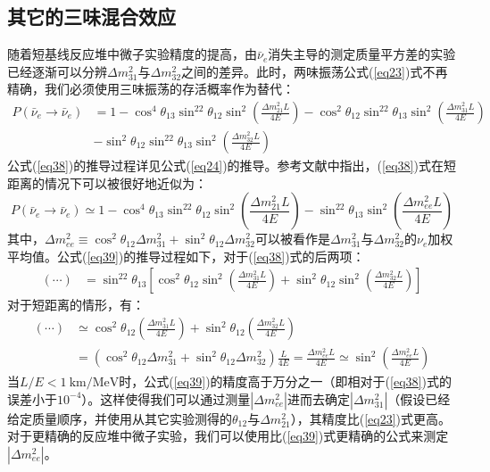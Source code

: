 \documentclass{article}
\begin{document}
	\subsection{其它的三味混合效应}
	随着短基线反应堆中微子实验精度的提高，由$\bar{\nu}_e$消失主导的测定质量平方差的实验已经逐渐可以分辨$\Delta m_{31}^2$与$\Delta m_{32}^2$之间的差异。此时，两味振荡公式(\ref{eq23})式不再精确，我们必须使用三味振荡的存活概率作为替代：
	\begin{equation}
		\begin{aligned}
		P(\bar{\nu}_e\to\bar{\nu}_e)&=1-\cos^4\theta_{13}\sin^22\theta_{12}\sin^2\left(\frac{\Delta m_{21}^2L}{4E}\right)-\cos^2\theta_{12}\sin^22\theta_{13}\sin^2\left(\frac{\Delta m_{31}^2L}{4E}\right)\\&-\sin^2\theta_{12}\sin^22\theta_{13}\sin^2\left(\frac{\Delta m_{32}^2L}{4E}\right)
		\end{aligned}
		\label{eq38}
	\end{equation}
	公式(\ref{eq38})的推导过程详见公式(\ref{eq24})的推导。参考文献\cite{nunokawa2005another}中指出，(\ref{eq38})式在短距离的情况下可以被很好地近似为：
	\begin{equation}
		P(\bar{\nu}_e\to\bar{\nu}_e)\simeq1-\cos^4\theta_{13}\sin^22\theta_{12}\sin^2\left(\frac{\Delta m_{21}^2L}{4E}\right)-\sin^22\theta_{13}\sin^2\left(\frac{\Delta m_{ee}^2L}{4E}\right)
		\label{eq39}
	\end{equation}
	其中，$\Delta m_{ee}^2\equiv\cos^2\theta_{12}\Delta m_{31}^2+\sin^2\theta_{12}\Delta m_{32}^2$可以被看作是$\Delta m_{31}^2$与$\Delta m_{32}^2$的$\nu_e$加权平均值。公式(\ref{eq39})的推导过程如下，对于(\ref{eq38})式的后两项：
	\begin{equation*}
		\begin{aligned}
			(\cdots)&=\sin^22\theta_{13}\left[\cos^2\theta_{12}\sin^2\left(\frac{\Delta m_{31}^2 L}{4E}\right)+\sin^2\theta_{12}\sin^2\left(\frac{\Delta m_{32}^2 L}{4E}\right)\right]
		\end{aligned}
	\end{equation*}
	对于短距离的情形，有：
	\begin{equation*}
		\begin{aligned}
			(\cdots)&\simeq\cos^2\theta_{12}\left(\frac{\Delta m_{31}^2 L}{4E}\right)+\sin^2\theta_{12}\left(\frac{\Delta m_{32}^2 L}{4E}\right)\\
			&=(\cos^2\theta_{12}\Delta m_{31}^2+\sin^2\theta_{12}\Delta m_{32}^2)\frac{L}{4E}=\frac{\Delta m_{ee}^2L}{4E}\simeq\sin^2\left(\frac{\Delta m_{ee}^2L}{4E}\right)
		\end{aligned}
	\end{equation*}
	当$L/E<1\ \mathrm{km/MeV}$时，公式(\ref{eq39})的精度高于万分之一（即相对于(\ref{eq38})式的误差小于$10^{-4}$）。这样使得我们可以通过测量$|\Delta m_{ee}^2|$进而去确定$|\Delta m_{31}^2|$（假设已经给定质量顺序，并使用从其它实验测得的$\theta_{12}$与$\Delta m_{21}^2$），其精度比(\ref{eq23})式更高。对于更精确的反应堆中微子实验，我们可以使用比(\ref{eq39})式更精确的公式来测定$|\Delta m_{ee}^2|$\cite{parke2016delta}。
	
\end{document}
